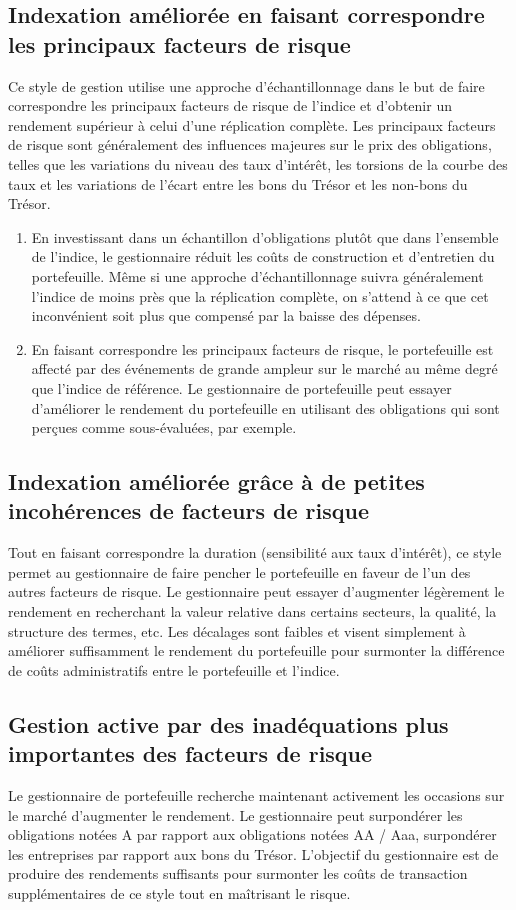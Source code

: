 \documentclass[12pt]{article}
\begin{document}
\subsection{Indexation améliorée en faisant correspondre les principaux facteurs de risque}
Ce style de gestion utilise une approche d'échantillonnage dans le but de faire correspondre les principaux facteurs de risque de l'indice et d'obtenir un rendement supérieur à celui d'une réplication complète. Les principaux facteurs de risque sont généralement des influences majeures sur le prix des obligations, telles que les variations du niveau des taux d'intérêt, les torsions de la courbe des taux et les variations de l'écart entre les bons du Trésor et les non-bons du Trésor. 
\begin{enumerate}
\item En investissant dans un échantillon d'obligations plutôt que dans l'ensemble de l'indice, le gestionnaire réduit les coûts de construction et d'entretien du portefeuille. Même si une approche d'échantillonnage suivra généralement l'indice de moins près que la réplication complète, on s'attend à ce que cet inconvénient soit plus que compensé par la baisse des dépenses.
\item En faisant correspondre les principaux facteurs de risque, le portefeuille est affecté par des événements de grande ampleur sur le marché au même degré que l'indice de référence. Le gestionnaire de portefeuille peut essayer d’améliorer le rendement du portefeuille en utilisant des obligations qui sont perçues comme sous-évaluées, par exemple.
\end{enumerate}
\subsection{Indexation améliorée grâce à de petites incohérences de facteurs de risque}
Tout en faisant correspondre la duration (sensibilité aux taux d'intérêt), ce style permet au gestionnaire de faire pencher le portefeuille en faveur de l'un des autres facteurs de risque. Le gestionnaire peut essayer d'augmenter légèrement le rendement en recherchant la valeur relative dans certains secteurs, la qualité, la structure des termes, etc. Les décalages sont faibles
et visent simplement à améliorer suffisamment le rendement du portefeuille pour surmonter la différence de coûts administratifs entre le portefeuille et l’indice.
\subsection{Gestion active par des inadéquations plus importantes des facteurs de risque}
Le gestionnaire de portefeuille recherche maintenant activement les occasions sur le marché d'augmenter le rendement. Le gestionnaire peut surpondérer les obligations notées A par rapport aux obligations notées AA / Aaa, surpondérer les entreprises par rapport aux bons du Trésor. L’objectif du gestionnaire est de produire des rendements suffisants pour surmonter les coûts de transaction supplémentaires de ce style tout en maîtrisant le risque.
\end{document}
